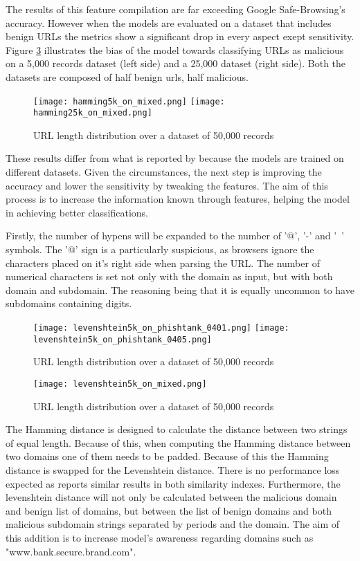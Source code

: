 The results of this feature compilation are far exceeding Google Safe-Browsing's accuracy. However when the models are evaluated on a dataset that includes benign URLs the metrics show a significant drop in every aspect exept sensitivity. Figure \ref{fig:HAMMING_ON_MIXED} illustrates the bias of the model towards classifying URLs as malicious on a 5,000 records dataset (left side) and a 25,000 dataset (right side). Both the datasets are composed of half benign urls, half malicious.

\begin{figure}[b]
	\centering
	\texttt{[image: hamming5k\_on\_mixed.png]}	\texttt{[image: hamming25k\_on\_mixed.png]}
	\caption{URL length distribution over a dataset of 50,000 records}
	\label{fig:HAMMING_ON_MIXED}
\end{figure}

These results differ from what is reported by \cite{SVM_SIMILARITY_INDEX} because the models are trained on different datasets. Given the circumstances, the next step is improving the accuracy and lower the sensitivity by tweaking the features. The aim of this process is to increase the information known through features, helping the model in achieving better classifications.

Firstly, the number of hypens will be expanded to the number of '@', '-' and '~' symbols. The '@' sign is a particularly suspicious, as browsers ignore the characters placed on it's right side when parsing the URL. The number of numerical characters is set not only with the domain as input, but with both domain and subdomain. The reasoning being that it is equally uncommon to have subdomains containing digits.

\begin{figure}[t]
	\centering
	\texttt{[image: levenshtein5k\_on\_phishtank\_0401.png]}	\texttt{[image: levenshtein5k\_on\_phishtank\_0405.png]}
	\caption{URL length distribution over a dataset of 50,000 records}
	\label{fig:HAMMING_ON_MIXED}
\end{figure}

\begin{figure}[b]
	\centering
	\texttt{[image: levenshtein5k\_on\_mixed.png]}
	\caption{URL length distribution over a dataset of 50,000 records}
	\label{fig:HAMMING_ON_MIXED}
\end{figure}

The Hamming distance is designed to calculate the distance between two strings of equal length. Because of this, when computing the Hamming distance between two domains one of them needs to be padded. Because of this the Hamming distance is swapped for the Levenshtein distance. There is no performance loss expected as \cite{SVM_SIMILARITY_INDEX} reports similar results in both similarity indexes. Furthermore, the levenshtein distance will not only be calculated between the malicious domain and benign list of domains, but between the list of benign domains and both malicious subdomain strings separated by periods and the domain. The aim of this addition is to increase model's awareness regarding domains such as "www.bank.secure.brand.com".

